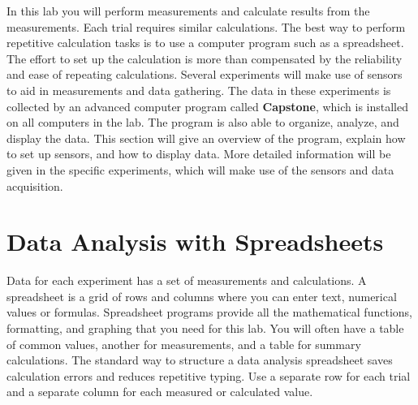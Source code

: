 


In this lab you will perform measurements and calculate results from the measurements. Each trial requires similar calculations.  The best way to perform repetitive calculation tasks is to use a computer program such as a spreadsheet. The effort to set up the calculation is more than compensated by the reliability and ease of repeating calculations. Several experiments will make use of sensors to aid in measurements and data gathering. The data in these experiments is collected by an advanced computer program called \textbf{Capstone}, which is installed on all computers in the lab. The program is also able to organize, analyze, and display the data. This section will give an overview of the program, explain how to set up sensors, and how to display data. More detailed information will be given in the specific experiments, which will make use of the sensors and data acquisition.

\section{Data Analysis with Spreadsheets}
\label{sec:dataSpreadsheet}

Data for each experiment has a set of measurements and calculations.
A spreadsheet is a grid of rows and columns where you can enter text, numerical values or formulas.
Spreadsheet programs provide all the mathematical functions, formatting, and graphing that you need for this lab.
You will often have a table of common values, another for measurements, and a table for summary calculations.
The standard way to structure a data analysis spreadsheet saves calculation errors and reduces repetitive typing.
Use a separate row for each trial and a separate column for each measured or calculated value.

